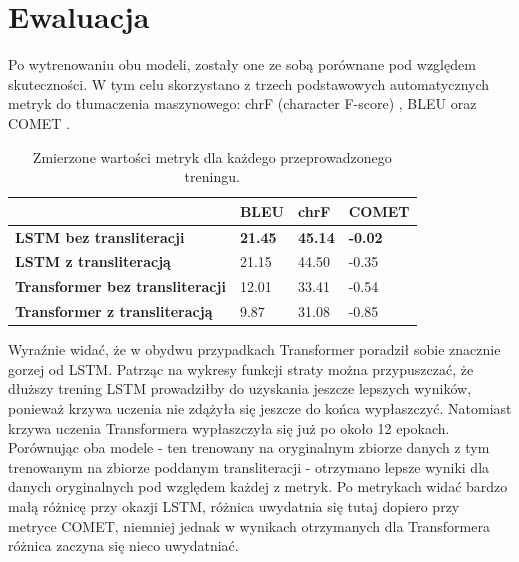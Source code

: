 \documentclass[
    left=2.5cm,         %
    right=2.5cm,        %
    top=2.5cm,          %
    bottom=3cm,         %
    bindingoffset=6mm,  %
    nohyphenation=false %
]{eiti/eiti-report}
\begin{document}
\section{Ewaluacja}
    
    Po wytrenowaniu obu modeli, zostały one ze sobą porównane pod względem skuteczności. W tym celu skorzystano z trzech podstawowych automatycznych metryk do tłumaczenia maszynowego: chrF (character F-score) \cite{popovic-2015-chrf}, BLEU \cite{BLEU} oraz COMET \cite{COMET}.
    
\begin{table}[H]
\centering
\footnotesize
\begin{tabular}{ |p{5cm}||p{3cm}|p{3cm}|p{3cm}|  }
    \hline
    \footnotesize{} & \footnotesize{BLEU} & \footnotesize{chrF}&  \footnotesize{COMET} \\
    \hline
     \textbf{LSTM bez transliteracji} & \textbf{21.45}  &  \textbf{45.14}  & \textbf{-0.02} \\
     \hline
     \textbf{LSTM z transliteracją} & 21.15  &  44.50  & -0.35 \\
     \hline
     \textbf{Transformer bez transliteracji} & 12.01  &  33.41  & -0.54 \\
     \hline
     \textbf{Transformer z transliteracją} & 9.87 & 31.08 & -0.85 \\
     \hline
\end{tabular}
\caption{Zmierzone wartości metryk dla każdego przeprowadzonego treningu.}
\label{tab:attr_table}
\end{table}

Wyraźnie widać, że w obydwu przypadkach Transformer poradził sobie znacznie gorzej od LSTM. Patrząc na wykresy funkcji straty można przypuszczać, że dłuższy trening LSTM prowadziłby do uzyskania jeszcze lepszych wyników, ponieważ krzywa uczenia nie zdążyła się jeszcze do końca wypłaszczyć. Natomiast krzywa uczenia Transformera wypłaszczyła się już po około 12 epokach.\\

Porównując oba modele - ten trenowany na oryginalnym zbiorze danych z tym trenowanym na zbiorze poddanym transliteracji - otrzymano lepsze wyniki dla danych oryginalnych pod względem każdej z metryk. Po metrykach widać bardzo małą różnicę przy okazji LSTM, różnica uwydatnia się tutaj dopiero przy metryce COMET, niemniej jednak w wynikach otrzymanych dla Transformera różnica zaczyna się nieco uwydatniać.\\
\end{document}
